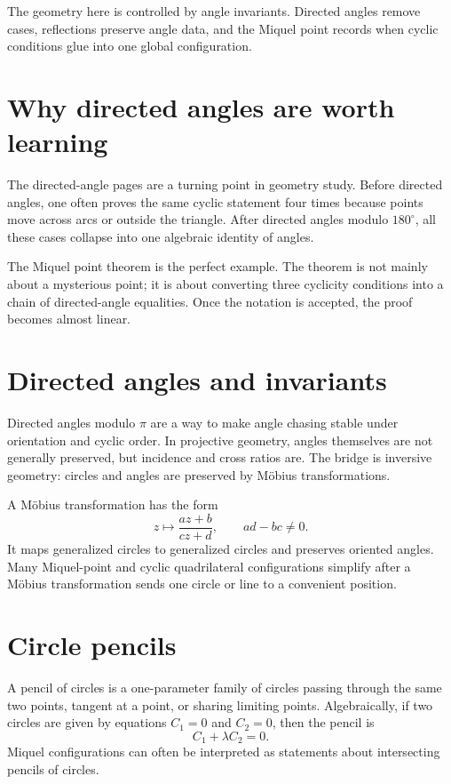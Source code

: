 The geometry here is controlled by angle invariants.  Directed angles remove cases, reflections preserve angle data, and the Miquel point records when cyclic conditions glue into one global configuration.

\section{Why directed angles are worth learning}

The directed-angle pages are a turning point in geometry study.  Before directed angles, one often proves the same cyclic statement four times because points move across arcs or outside the triangle.  After directed angles modulo \(180^\circ\), all these cases collapse into one algebraic identity of angles.

The Miquel point theorem is the perfect example.  The theorem is not mainly about a mysterious point; it is about converting three cyclicity conditions into a chain of directed-angle equalities.  Once the notation is accepted, the proof becomes almost linear.

\section{Directed angles and invariants}

Directed angles modulo $\pi$ are a way to make angle chasing stable under orientation and cyclic order.  In projective geometry, angles themselves are not generally preserved, but incidence and cross ratios are.  The bridge is inversive geometry: circles and angles are preserved by Möbius transformations.

A Möbius transformation has the form
\[
  z\mapsto \frac{az+b}{cz+d},\qquad ad-bc\ne0.
\]
It maps generalized circles to generalized circles and preserves oriented angles.  Many Miquel-point and cyclic quadrilateral configurations simplify after a Möbius transformation sends one circle or line to a convenient position.

\section{Circle pencils}

A pencil of circles is a one-parameter family of circles passing through the same two points, tangent at a point, or sharing limiting points.  Algebraically, if two circles are given by equations $C_1=0$ and $C_2=0$, then the pencil is
\[
  C_1+\lambda C_2=0.
\]
Miquel configurations can often be interpreted as statements about intersecting pencils of circles.

